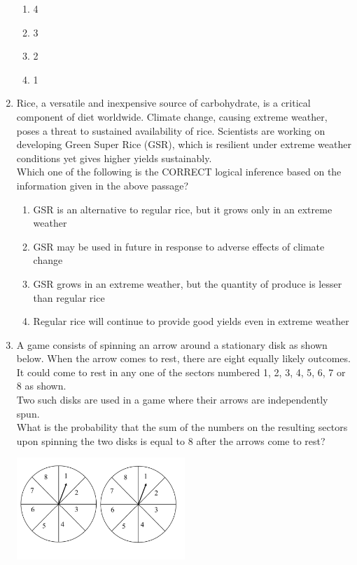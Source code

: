 \documentclass[journal,12pt,onecolumn]{exam}
\theoremstyle{remark}
\begin{document}
\begin{enumerate}
    \begin{enumerate}
        \item 4
        \item 3
        \item 2
        \item 1
    \end{enumerate}
    \item Rice, a versatile and inexpensive source of carbohydrate, is a critical component of diet worldwide. Climate change, causing extreme weather, poses a threat to sustained availability of rice. Scientists are working on developing Green Super Rice (GSR), which is resilient under extreme weather conditions yet gives higher yields sustainably.\\

    Which one of the following is the CORRECT logical inference based on the information given in the above passage?

    \begin{enumerate}
        \item GSR is an alternative to regular rice, but it grows only in an extreme weather
        \item GSR may be used in future in response to adverse effects of climate change
        \item GSR grows in an extreme weather, but the quantity of produce is lesser than regular rice
        \item Regular rice will continue to provide good yields even in extreme weather
    \end{enumerate}
    
    \newpage
        \item A game consists of spinning an arrow around a stationary disk as shown below. When the arrow comes to rest, there are eight equally likely outcomes. It could come to rest in any one of the sectors numbered 1, 2, 3, 4, 5, 6, 7 or 8 as shown.\\

    Two such disks are used in a game where their arrows are independently spun.\\

    What is the probability that the sum of the numbers on the resulting sectors upon spinning the two disks is equal to 8 after the arrows come to rest?

    \begin{center}
        \includegraphics[width=0.5\textwidth]{figs/q 7.png} %
    \end{center}


\end{enumerate}
\end{document}
